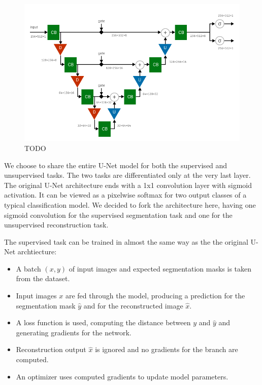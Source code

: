 \begin{figure}[ht]
    \centering
    \includegraphics[width=140mm]{../img/architecture-complete.pdf}
    \caption{TODO}
    \label{fig:ArchitectureCombined}
\end{figure}

We choose to share the entire U-Net model for both the supervised and unsupervised tasks. The two tasks are differentiated only at the very last layer. The original U-Net architecture ends with a 1x1 convolution layer with sigmoid activation. It can be viewed as a pixelwise softmax for two output classes of a typical classification model. We decided to fork the architecture here, having one sigmoid convolution for the supervised segmentation task and one for the unsupervised reconstruction task.

The supervised task can be trained in almost the same way as the the original U-Net archtiecture:

\begin{itemize}
    \item A batch $(x, y)$ of input images and expected segmentation masks is taken from the dataset.
    \item Input images $x$ are fed through the model, producing a prediction for the segmentation mask $\hat{y}$ and for the reconstructed image $\hat{x}$.
    \item A loss function is used, computing the distance between $y$ and $\hat{y}$ and generating gradients for the network.
    \item Reconstruction output $\hat{x}$ is ignored and no gradients for the branch are computed.
    \item An optimizer uses computed gradients to update model parameters.
\end{itemize}

